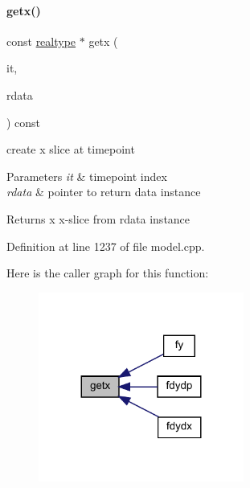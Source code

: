 \paragraph{\texorpdfstring{getx()}{getx()}}
{\footnotesize\ttfamily const \mbox{\hyperlink{namespaceamici_a1bdce28051d6a53868f7ccbf5f2c14a3}{realtype}} $\ast$ getx (\begin{DoxyParamCaption}\item[{const int}]{it,  }\item[{const \mbox{\hyperlink{classamici_1_1_return_data}{Return\+Data}} $\ast$}]{rdata }\end{DoxyParamCaption}) const\hspace{0.3cm}{\ttfamily [protected]}}

create x slice at timepoint 
\begin{DoxyParams}{Parameters}
{\em it} & timepoint index \\
\hline
{\em rdata} & pointer to return data instance \\
\hline
\end{DoxyParams}
\begin{DoxyReturn}{Returns}
x x-\/slice from rdata instance 
\end{DoxyReturn}


Definition at line 1237 of file model.\+cpp.

Here is the caller graph for this function\+:
\nopagebreak
\begin{figure}[H]
\begin{center}
\leavevmode
\includegraphics[width=191pt]{classamici_1_1_model_abefad4b8b4ba76bad66f57504affca9b_icgraph}
\end{center}
\end{figure}
\mbox{\label{classamici_1_1_model_ae808a142aab292ef1b424bc3a0d924a0}} 
